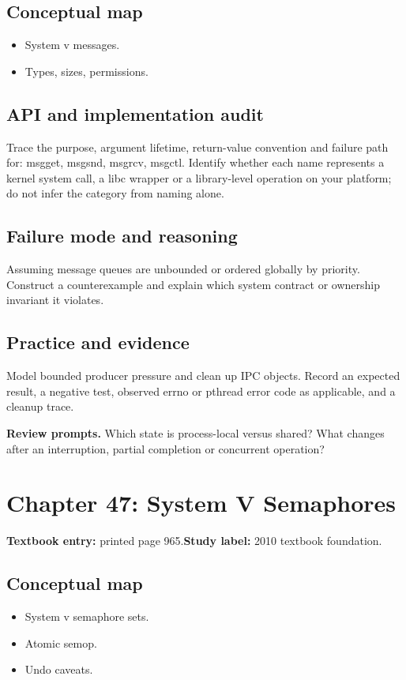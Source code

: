 \documentclass[11pt,letterpaper,oneside]{report}
\begin{document}
\subsection{Conceptual map}
\begin{itemize}
\item System v messages.
\item Types, sizes, permissions.
\end{itemize}
\subsection{API and implementation audit}
Trace the purpose, argument lifetime, return-value convention and failure path for: msgget, msgsnd, msgrcv, msgctl. Identify whether each name represents a kernel system call, a libc wrapper or a library-level operation on your platform; do not infer the category from naming alone.

\subsection{Failure mode and reasoning}
Assuming message queues are unbounded or ordered globally by priority. Construct a counterexample and explain which system contract or ownership invariant it violates.

\subsection{Practice and evidence}
Model bounded producer pressure and clean up IPC objects. Record an expected result, a negative test, observed errno or pthread error code as applicable, and a cleanup trace.

\textbf{Review prompts.} Which state is process-local versus shared? What changes after an interruption, partial completion or concurrent operation?

\section{Chapter 47: System V Semaphores}
\textbf{Textbook entry:} printed page 965.\quad \textbf{Study label:} 2010 textbook foundation.

\subsection{Conceptual map}
\begin{itemize}
\item System v semaphore sets.
\item Atomic semop.
\item Undo caveats.
\end{itemize}
\end{document}
